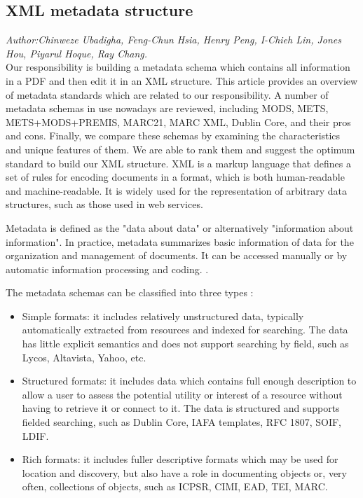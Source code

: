 \subsection{XML metadata structure}
\textit{\footnotesize Author:Chinweze Ubadigha, Feng-Chun Hsia, Henry Peng, I-Chieh Lin, Jones Hou, Piyarul Hoque, Ray Chang.}\\

Our responsibility is building a metadata schema which contains all information in a PDF and then edit it in an XML structure. This article provides an overview of metadata standards which are related to our responsibility. A number of metadata schemas in use nowadays are reviewed, including MODS, METS, METS+MODS+PREMIS, MARC21, MARC XML, Dublin Core, and  their pros and cons. Finally, we compare these schemas by examining the characteristics and unique features of them. We are able to rank them and suggest the optimum standard to build our XML structure. XML is a markup language that defines a set of rules for encoding documents in a format,  which is both human-readable and machine-readable. It is widely used for the representation of arbitrary data structures, such as those used in web services.

Metadata is defined as the "data about data" or alternatively "information about information". In practice, metadata summarizes basic information of data for the organization and management of documents. It can be accessed manually or by automatic information processing and coding. \cite{underwood2003xml}.

The metadata schemas can be classified into three types \cite{dempsey1997specification}:
\begin{itemize}
	\item Simple formats: it includes relatively unstructured data, typically automatically extracted from resources and indexed for searching. The data has little explicit semantics and does not support searching by field, such as Lycos, Altavista, Yahoo, etc.
	\item Structured formats: it includes data which contains full enough description to allow a user to assess the potential utility or interest of a resource without having to retrieve it or connect to it. The data is structured and supports fielded searching, such as Dublin Core, IAFA templates, RFC 1807, SOIF, LDIF.
	\item Rich formats: it includes fuller descriptive formats which may be used for location and discovery, but also have a role in documenting objects or, very often, collections of objects, such as ICPSR, CIMI, EAD, TEI, MARC.
\end{itemize}

